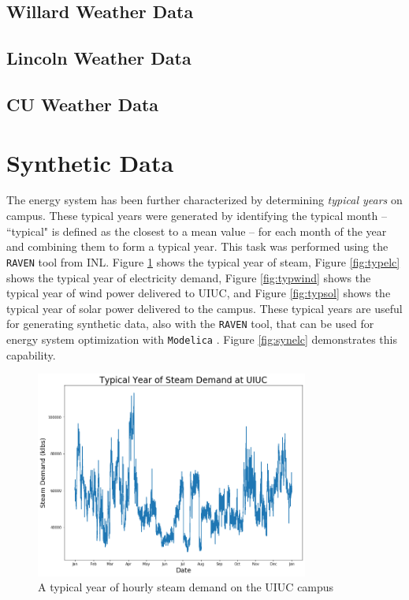 	\subsection{Willard Weather Data}
		
	\subsection{Lincoln Weather Data}

	\subsection{CU Weather Data}
	
\section{Synthetic Data}
	The energy system has been further characterized by determining \textit{typical years}
	on campus. These typical years were generated by identifying the typical month --  ``typical" is defined as the closest to a mean value -- for each month of the
	year and combining them to form a typical year. This task was performed using
	the \texttt{RAVEN} tool from INL. Figure \ref{fig:typstm} shows the typical year
	of steam, Figure \ref{fig:typelc} shows the typical year of electricity demand,
	Figure \ref{fig:typwind} shows the typical year of wind power delivered to UIUC, and Figure \ref{fig:typsol} shows the typical year of solar power
	delivered to the campus. These typical years are useful for generating synthetic
	data, also with the \texttt{RAVEN} tool, that can be used for energy system
	optimization with \texttt{Modelica} \cite{epiney_report_2017, baker_optimal_2018}. Figure \ref{fig:synelc} demonstrates this capability.

	\begin{figure}[H]
	  \centering
	  \includegraphics[width=0.8\textwidth]{./figures/typicalsteam.png}
	  \caption{A typical year of hourly steam demand on the UIUC campus}
	  \label{fig:typstm}
	\end{figure}

